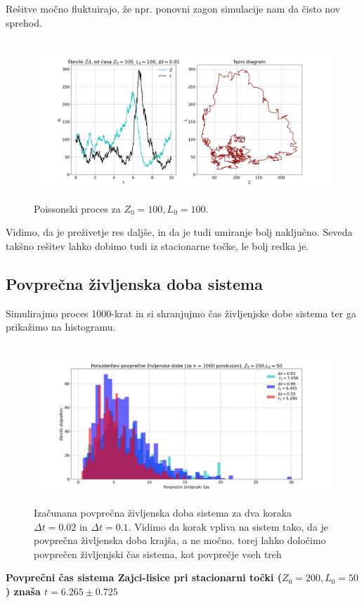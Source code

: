 \documentclass[11pt, a4paper]{article}
\begin{document}
 Rešitve močno fluktuirajo, že npr. ponovni zagon simulacije nam da čisto nov sprehod.
 \begin{figure}[H]
\centering

  \includegraphics[width=18cm, height=6cm]{tretja_4.png}
  \caption{Poissonski proces za $Z_0 =100, L_0 = 100$.}  

   
 \end{figure}
 Vidimo, da je preživetje res daljše, in da je tudi umiranje bolj naključno. Seveda takšno rešitev lahko dobimo tudi iz stacionarne točke, le bolj redka je.
\subsection{Povprečna življenska doba sistema}
Simulirajmo proces 1000-krat in si shranjujmo čas življenjske dobe sistema ter ga prikažimo na histogramu.
 \begin{figure}[H]
\centering

  \includegraphics[width=16cm, height=6cm]{tretja_6.png}
  \caption{Izačunana povprečna življenska doba sistema za dva koraka $\Delta t = 0.02 $ in $\Delta t = 0.1$. Vidimo da korak vpliva na sistem tako, da je povprečna življenska doba krajša, a ne močno. torej lahko določimo povprečen življenjski čas sistema, kot povprečje vseh treh} 
   
 \end{figure}
 \textbf{ Povprečni čas sistema Zajci-lisice pri stacionarni točki ($Z_0 = 200, L_0 = 50$) znaša $t = 6.265  \pm 0.725$} 
\end{document}
